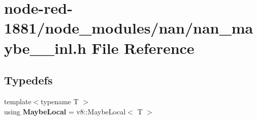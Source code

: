 \section{node-\/red-\/1881/node\+\_\+modules/nan/nan\+\_\+maybe\+\_\+\_\+inl.h File Reference}
\label{nan__maybe__43__inl_8h}
\subsection*{Typedefs}
\begin{DoxyCompactItemize}
\item 
{\footnotesize template$<$typename T $>$ }\\using \textbf{ Maybe\+Local} = v8\+::\+Maybe\+Local$<$ T $>$
\end{DoxyCompactItemize}
